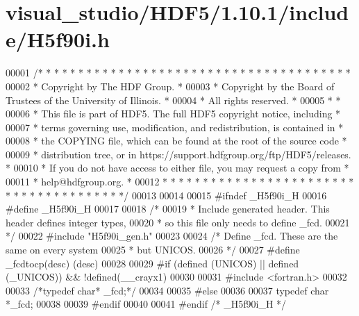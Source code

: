 \hypertarget{visual__studio_2_h_d_f5_21_810_81_2include_2_h5f90i_8h_source}{}\section{visual\+\_\+studio/\+H\+D\+F5/1.10.1/include/\+H5f90i.h}
\label{visual__studio_2_h_d_f5_21_810_81_2include_2_h5f90i_8h_source}

\begin{DoxyCode}
00001 \textcolor{comment}{/* * * * * * * * * * * * * * * * * * * * * * * * * * * * * * * * * * * * * * *}
00002 \textcolor{comment}{ * Copyright by The HDF Group.                                               *}
00003 \textcolor{comment}{ * Copyright by the Board of Trustees of the University of Illinois.         *}
00004 \textcolor{comment}{ * All rights reserved.                                                      *}
00005 \textcolor{comment}{ *                                                                           *}
00006 \textcolor{comment}{ * This file is part of HDF5.  The full HDF5 copyright notice, including     *}
00007 \textcolor{comment}{ * terms governing use, modification, and redistribution, is contained in    *}
00008 \textcolor{comment}{ * the COPYING file, which can be found at the root of the source code       *}
00009 \textcolor{comment}{ * distribution tree, or in https://support.hdfgroup.org/ftp/HDF5/releases.  *}
00010 \textcolor{comment}{ * If you do not have access to either file, you may request a copy from     *}
00011 \textcolor{comment}{ * help@hdfgroup.org.                                                        *}
00012 \textcolor{comment}{ * * * * * * * * * * * * * * * * * * * * * * * * * * * * * * * * * * * * * * */}
00013 
00014 
00015 \textcolor{preprocessor}{#ifndef \_H5f90i\_H}
00016 \textcolor{preprocessor}{#define \_H5f90i\_H}
00017 
00018 \textcolor{comment}{/*}
00019 \textcolor{comment}{ * Include generated header.  This header defines integer types,}
00020 \textcolor{comment}{ * so this file only needs to define \_fcd.}
00021 \textcolor{comment}{ */}
00022 \textcolor{preprocessor}{#include "H5f90i\_gen.h"}
00023 
00024 \textcolor{comment}{/* Define \_fcd.  These are the same on every system}
00025 \textcolor{comment}{ * but UNICOS.}
00026 \textcolor{comment}{ */}
00027 \textcolor{preprocessor}{#define \_fcdtocp(desc) (desc)}
00028 
00029 \textcolor{preprocessor}{#if (defined (UNICOS) || defined (\_UNICOS)) && !defined(\_\_crayx1)}
00030 
00031 \textcolor{preprocessor}{#include <fortran.h>}
00032 
00033 \textcolor{comment}{/*typedef char*              \_fcd;*/}
00034 
00035 \textcolor{preprocessor}{#else}
00036 
00037 \textcolor{keyword}{typedef} \textcolor{keywordtype}{char}              *\_fcd;
00038 
00039 \textcolor{preprocessor}{#endif}
00040 
00041 \textcolor{preprocessor}{#endif }\textcolor{comment}{/* \_H5f90i\_H */}\textcolor{preprocessor}{}
\end{DoxyCode}

